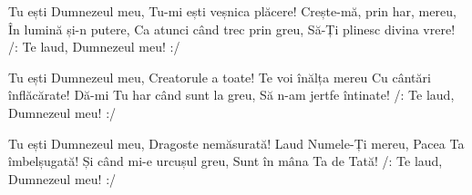 \beginverse
Tu ești Dumnezeul meu,
Tu-mi ești veșnica plăcere!
Crește-mă, prin har, mereu,
În lumină și-n putere,
Ca atunci când trec prin greu,
Să-Ți plinesc divina vrere!
/: Te laud, Dumnezeul meu! :/
\endverse

\beginverse
Tu ești Dumnezeul meu,
Creatorule a toate!
Te voi înălța mereu
Cu cântări înflăcărate!
Dă-mi Tu har când sunt la greu,
Să n-am jertfe întinate!
/: Te laud, Dumnezeul meu! :/
\endverse

\beginverse
Tu ești Dumnezeul meu,
Dragoste nemăsurată!
Laud Numele-Ți mereu,
Pacea Ta îmbelșugată!
Și când mi-e urcușul greu,
Sunt în mâna Ta de Tată!
/: Te laud, Dumnezeul meu! :/
\endverse
\endsong